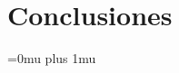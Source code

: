 \documentclass[
11pt, %
spanish,
singlespacing, %
parskip, %
headsepline, %
]{MastersDoctoralThesis} %
\begin{document}


\chapter{Conclusiones} %
\label{ChapterConclusiones} %

 


\appendix 


%
%
%


\Urlmuskip=0mu plus 1mu\relax
\raggedright
\printbibliography[heading=bibintoc]

\end{document}
